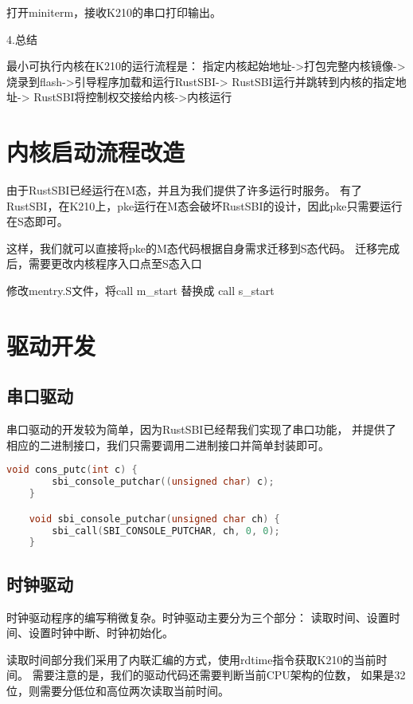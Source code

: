 打开miniterm，接收K210的串口打印输出。

4.总结

最小可执行内核在K210的运行流程是：
指定内核起始地址->打包完整内核镜像->
烧录到flash->引导程序加载和运行RustSBI->
RustSBI运行并跳转到内核的指定地址->
RustSBI将控制权交接给内核->内核运行

\section{内核启动流程改造}

由于RustSBI已经运行在M态，并且为我们提供了许多运行时服务。
有了RustSBI，在K210上，pke运行在M态会破坏RustSBI的设计，因此pke只需要运行在S态即可。

这样，我们就可以直接将pke的M态代码根据自身需求迁移到S态代码。
迁移完成后，需要更改内核程序入口点至S态入口

修改mentry.S文件，将call m\_start 替换成 call s\_start

\section{驱动开发}

\subsection{串口驱动}

串口驱动的开发较为简单，因为RustSBI已经帮我们实现了串口功能，
并提供了相应的二进制接口，我们只需要调用二进制接口并简单封装即可。

\begin{lstlisting}[caption={串口驱动}, label={lst:uart_driver}, language=C]
    void cons_putc(int c) {
        sbi_console_putchar((unsigned char) c);
    }    

    void sbi_console_putchar(unsigned char ch) {
        sbi_call(SBI_CONSOLE_PUTCHAR, ch, 0, 0);
    }    
\end{lstlisting}

\subsection{时钟驱动}

时钟驱动程序的编写稍微复杂。时钟驱动主要分为三个部分：
读取时间、设置时间、设置时钟中断、时钟初始化。

读取时间部分我们采用了内联汇编的方式，使用rdtime指令获取K210的当前时间。
需要注意的是，我们的驱动代码还需要判断当前CPU架构的位数，
如果是32位，则需要分低位和高位两次读取当前时间。

